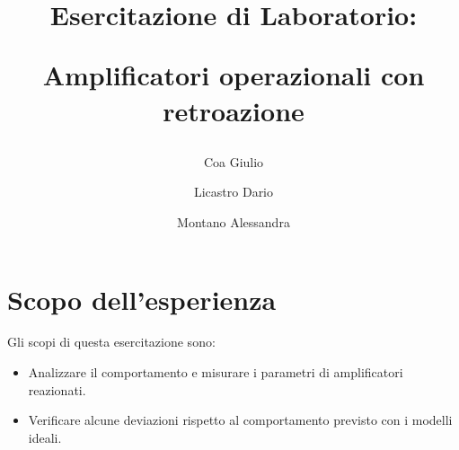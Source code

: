 \documentclass[a4paper]{article}
\title{
	\begin{center}
		Esercitazione di Laboratorio:
	\end{center}
	\newline
	\begin{center}
		Amplificatori operazionali con retroazione
	\end{center}
}
\author{
	Coa Giulio
	\and
	Licastro Dario
	\and
	Montano Alessandra
}
\begin{document}
	\begin{titlingpage}
		\maketitle
	\end{titlingpage}
	\newpage
	\section{Scopo dell'esperienza}
	Gli scopi di questa esercitazione sono:
	\begin{itemize}
		\item Analizzare il comportamento e misurare i parametri di amplificatori reazionati.
		\item Verificare alcune deviazioni rispetto al comportamento previsto con i modelli ideali.
	\end{itemize}
\end{document}
